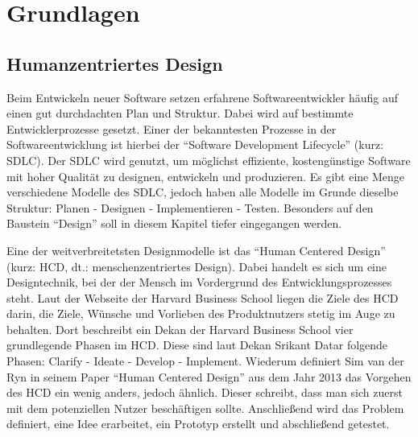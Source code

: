 
\chapter{Grundlagen}
\label{chapter:3}

\section{Humanzentriertes Design}

Beim Entwickeln neuer Software setzen erfahrene Softwareentwickler häufig auf einen gut durchdachten Plan und Struktur. Dabei wird auf bestimmte Entwicklerprozesse gesetzt. Einer der bekanntesten Prozesse in der Softwareentwicklung ist hierbei der “Software Development Lifecycle” (kurz: SDLC). Der SDLC wird genutzt, um möglichst effiziente, kostengünstige Software mit hoher Qualität zu designen, entwickeln und produzieren.\cite{shylesh:2017} Es gibt eine Menge verschiedene Modelle des SDLC, jedoch haben alle Modelle im Grunde dieselbe Struktur: Planen - Designen - Implementieren - Testen. Besonders auf den Baustein “Design” soll in diesem Kapitel tiefer eingegangen werden.

Eine der weitverbreitetsten Designmodelle ist das “Human Centered Design” (kurz: HCD, dt.: menschenzentriertes Design).  Dabei handelt es sich um eine Designtechnik, bei der der Mensch im Vordergrund des Entwicklungsprozesses steht.\cite{hbsc:2020} Laut der Webseite der Harvard Business School liegen die Ziele des HCD darin, die Ziele, Wünsche und Vorlieben des Produktnutzers stetig im Auge zu behalten.\cite{hbsc:2020} Dort beschreibt ein Dekan der Harvard Business School vier grundlegende Phasen im HCD. Diese sind laut Dekan Srikant Datar folgende Phasen: Clarify - Ideate - Develop - Implement.\cite{hbsc:2020} Wiederum definiert Sim van der Ryn in seinem Paper “Human Centered Design” aus dem Jahr 2013 das Vorgehen des HCD ein wenig anders, jedoch ähnlich. Dieser schreibt, dass man sich zuerst mit dem potenziellen Nutzer beschäftigen sollte.\cite{vanderryn:2013} Anschließend wird das Problem definiert, eine Idee erarbeitet, ein Prototyp erstellt und abschließend getestet.\cite{vanderryn:2013}

